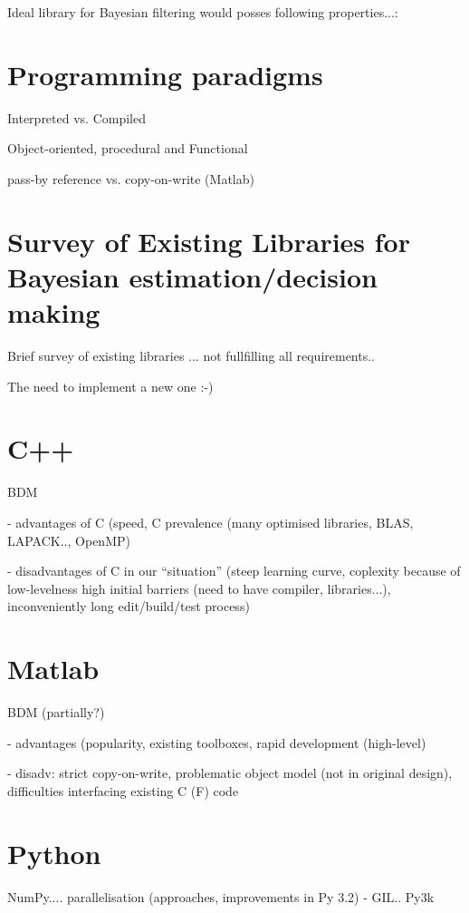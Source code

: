 \documentclass[a4paper,12pt,oneside]{report}
\begin{document}
Ideal library for Bayesian filtering would posses following properties...:

\section{Programming paradigms}

Interpreted vs. Compiled

Object-oriented, procedural and Functional

pass-by reference vs. copy-on-write (Matlab)

\section{Survey of Existing Libraries for Bayesian estimation/decision making}

Brief survey of existing libraries ... not fullfilling all requirements..

The need to implement a new one :-)

\section{C++}

BDM

 - advantages of C (speed, C prevalence (many optimised libraries, BLAS, LAPACK.., OpenMP)

 - disadvantages of C in our ``situation'' (steep learning curve, coplexity because of low-levelness
   high initial barriers (need to have compiler, libraries...), inconveniently long edit/build/test
   process)

\section{Matlab}

BDM (partially?)

 - advantages (popularity, existing toolboxes, rapid development (high-level)

 - disadv: strict copy-on-write, problematic object model (not in original design), difficulties
           interfacing existing C (F) code

\section{Python}

NumPy.... parallelisation (approaches, improvements in Py 3.2) - GIL.. Py3k
\end{document}
